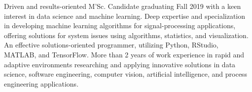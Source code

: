 

\begin{cvparagraph}

Driven and results-oriented M'Sc. Candidate graduating Fall 2019 with a keen interest in data science and machine learning. Deep expertise and specialization in developing machine learning algorithms for signal-processing applications, offering solutions for system issues using algorithms, statistics, and visualization. An effective solutions-oriented programmer, utilizing Python, RStudio, MATLAB, and TensorFlow. More than 2 years of work experience in rapid and adaptive environments researching and applying innovative solutions in data science, software engineering, computer vision, artificial intelligence, and process engineering applications.
\end{cvparagraph}
